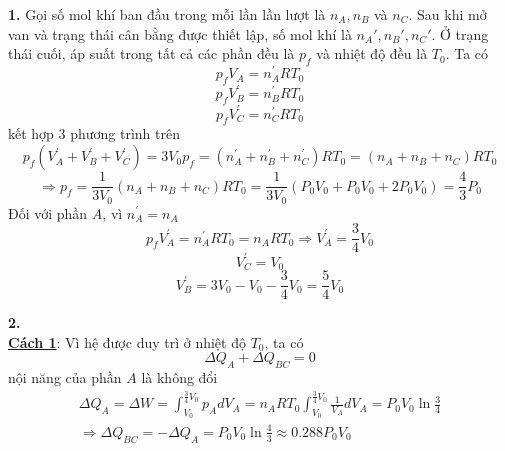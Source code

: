 \noindent\textbf{1.} Gọi số mol khí ban đầu trong mỗi lần lần lượt là $n_A, n_B$ và $n_C$. Sau khi mở van và trạng thái cân bằng được thiết lập, số mol khí là $n_A', n_B', n_C'$. Ở trạng thái cuối, áp suất trong tất cả các phần đều là $p_f$ và nhiệt độ đều là $T_0$. Ta có
\begin{equation*}
  p_{f}V_{A}=n_{A}^{\prime}RT_{0}
\end{equation*}
\begin{equation*}
  p_{f}V_{B}^{\prime}=n_{B}^{\prime}RT_{0}
\end{equation*}
\begin{equation*}
  p_{f}V_{C}^{\prime}=n_{C}^{\prime}RT_{0}
\end{equation*}
kết hợp 3 phương trình trên
\begin{equation*}
  p_{f}(V_{A}^{\prime}+V_{B}^{\prime}+V_{C}^{\prime})=3V_{0}p_{f}=(n_{A}^{\prime}+n_{B}^{\prime}+n_{C}^{\prime})RT_{0}=(n_{A}+n_{B}+n_{C})RT_{0}
\end{equation*}
\begin{equation*}
  \Rightarrow p_{f}=\frac{1}{3V_{0}}(n_{A}+n_{B}+n_{C})RT_{0}=\frac{1}{3V_{0}}(P_{0}V_{0}+P_{0}V_{0}+2P_{0}V_{0})=\frac{4}{3}P_{0}
\end{equation*}
Đối với phần $A$, vì $n_A^{\prime}=n_A$
\begin{equation*}
  p_{f}V_{A}^{\prime}=n_{A}^{\prime}RT_{0}=n_{A}RT_{0}\Rightarrow V_{A}^{\prime}=\frac{3}{4}V_{0}
\end{equation*}
\begin{equation*}
  V_{C}^{\prime}=V_{0}
\end{equation*}
\begin{equation*}
  V_{B}^{\prime}=3V_{0}-V_{0}-\frac{3}{4}V_{0}=\frac{5}{4}V_{0}
\end{equation*}

\noindent\textbf{2.}\\
\noindent\underline{\textbf{Cách 1}}: Vì hệ được duy trì ở nhiệt độ $T_0$, ta có
\begin{equation*}
  \Delta Q_A + \Delta Q_{BC}=0
\end{equation*}
nội năng của phần $A$ là không đổi
\begin{equation*}
  \begin{gathered}
    \Delta Q_{A}=\Delta W=\int_{V_{0}}^{\frac{3}{4}V_{0}}p_{A}dV_{A}=n_{A}RT_{0}\int_{V_{0}}^{\frac{3}{4}V_{0}}\frac{1}{V_{A}}dV_{A}=P_{0}V_{0}\ln\frac{3}{4} \\
    \Rightarrow\Delta Q_{BC}=-\Delta Q_{A}=P_{0}V_{0}\ln\frac{4}{3}\approx0.288P_{0}V_{0}
  \end{gathered}
\end{equation*}


